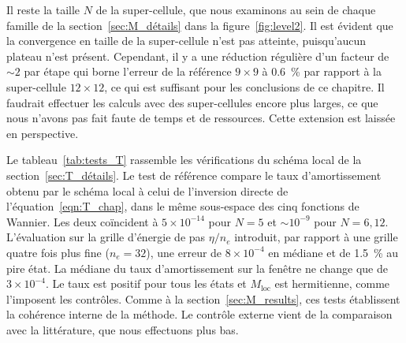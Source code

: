 Il reste la taille $N$ de la super-cellule, que nous examinons au sein de chaque famille de la section~\ref{sec:M_détails} dans la figure~\ref{fig:level2}. Il est évident que la convergence en taille de la super-cellule n'est pas atteinte, puisqu'aucun plateau n'est présent. Cependant, il y a une réduction régulière d'un facteur de $\sim 2$ par étape qui borne l'erreur de la référence $9\times9$ à $0.6$~\% par rapport à la super-cellule $12\times 12$, ce qui est suffisant pour les conclusions de ce chapitre. Il faudrait effectuer les calculs avec des super-cellules encore plus larges, ce que nous n'avons pas fait faute de temps et de ressources. Cette extension est laissée en perspective.

\newpage
{}

Le tableau~\ref{tab:tests_T} rassemble les vérifications du schéma local de la section~\ref{sec:T_détails}. Le test de référence compare le taux d'amortissement obtenu par le schéma local à celui de l'inversion directe de l'équation~\eqref{eqn:T_chap}, dans le même sous-espace des cinq fonctions de Wannier. Les deux coïncident à $5\times 10^{-14}$ pour $N=5$ et $\sim 10^{-9}$ pour $N=6, 12$. L'évaluation sur la grille d'énergie de pas $\eta/n_e$ introduit, par rapport à une grille quatre fois plus fine ($n_e = 32$), une erreur de $8\times 10^{-4}$ en médiane et de 1.5~\% au pire état. La médiane du taux d'amortissement sur la fenêtre ne change que de $3\times 10^{-4}$. Le taux est positif pour tous les états et $M_\text{loc}$ est hermitienne, comme l'imposent les contrôles. Comme à la section~\ref{sec:M_results}, ces tests établissent la cohérence interne de la méthode. Le contrôle externe vient de la comparaison avec la littérature, que nous effectuons plus bas.
